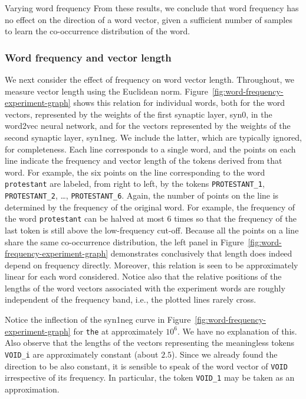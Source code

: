 \documentclass{article} %
\newcommand{\word}[1]{\texttt{#1}}
\begin{document}
\begin{section}{Varying word frequency}
From these results, we conclude that word frequency has no effect on the
direction of a word vector, given a sufficient number of samples to
learn the co-occurrence distribution of the word.

\subsubsection{Word frequency and vector length}
We next consider the effect of frequency on word vector length.
Throughout, we measure vector length using the Euclidean norm.
Figure~\ref{fig:word-frequency-experiment-graph} shows this relation for
individual words, both for the word vectors, represented by the weights
of the first synaptic layer, syn0, in the word2vec neural network, and
for the vectors represented by the weights of the second synaptic layer,
syn1neg.  We include the latter, which are typically ignored, for
completeness.  Each line corresponds to a single word, and the points on
each line indicate the frequency and vector length of the tokens derived
from that word.  For example, the six points on the line corresponding
to the word \word{protestant} are labeled, from right to left, by the
tokens \word{PROTESTANT\_1}, \word{PROTESTANT\_2}, \dots,
\word{PROTESTANT\_6}.  Again, the number of points on the line is
determined by the frequency of the original word.  For example, the
frequency of the word \word{protestant} can be halved at most $6$ times
so that the frequency of the last token is still above the
low-frequency cut-off.  Because all the points on a line share the same
co-occurrence distribution, the left panel in
Figure~\ref{fig:word-frequency-experiment-graph} demonstrates conclusively
that length does indeed depend on frequency directly.  Moreover, this
relation is seen to be approximately linear for each word considered.
Notice also that the relative positions of the lengths of the word vectors associated
with the experiment words are roughly independent of the frequency band,
i.e., the plotted lines rarely cross.

Notice the inflection of the syn1neg curve in
Figure~\ref{fig:word-frequency-experiment-graph} for \word{the} at
approximately $10^6$.  We have no explanation of this.  Also observe
that the lengths of the vectors representing the meaningless tokens
\word{VOID\_i} are approximately constant (about $2.5$).  Since we already found the
direction to be also constant, it is sensible to speak of the word
vector of \word{VOID} irrespective of its frequency.  In particular, the
token \word{VOID\_1} may be taken as an approximation.


\end{section}
\end{document}
